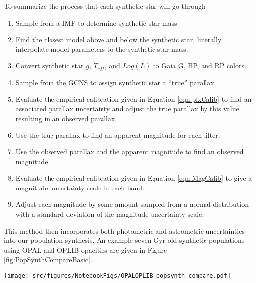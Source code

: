 To summarize the process that each synthetic star will go through
\begin{enumerate}
	\item Sample from a \citet{Sollima2019} IMF to determine synthetic star mass
	\item Find the closest model above and below the synthetic star, linerally
		interpolate model parameters to the synthetic star mass.
	\item Convert synthetic star $g$, $T_{eff}$, and $Log(L)$ to Gaia G, BP,
		and RP colors.
	\item Sample from the GCNS to assign synthetic star a ``true'' parallax.
	\item Evaluate the empirical calibration given in Equation
		\ref{eqn:plxCalib} to find an associated parallax uncertainty and
		adjust the true parallax by this value resulting in an observed
		parallax.
	\item Use the true parallax to find an apparent magnitude for each filter.
	\item Use the observed parallax and the apparent magnitude to find an
		observed magnitude
	\item Evaluate the empirical calibration given in Equation
		\ref{eqn:MagCalib} to give a magnitude uncertainty scale in each band.
	\item Adjust each magnitude by some amount sampled from a normal
		distribution with a standard deviation of the magnitude uncertainty
		scale.
\end{enumerate}

This method then incorporates both photometric and astrometric uncertainties
into our population synthesis. An example seven Gyr old synthetic populations
using OPAL and OPLIB opacities are given in Figure
\ref{fig:PopSynthCompareBasic}.

\begin{figure*}
	\centering
	\texttt{[image: src/figures/NotebookFigs/OPALOPLIB\_popsynth\_compare.pdf]}
	\caption{Population synthetis resulst for models evolved with OPAL (left)
	and models evolved with OPLIB (right). A gaussian kernel-density-estimate
	has been overlayed to better highlight the density variations. {\color{red}
	[THIS IS A PLACEHOLDER FIGURE]}}
	\label{fig:PopSynthCompareBasic}
\end{figure*}
